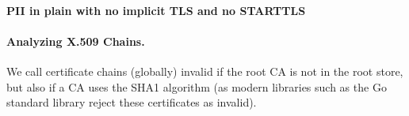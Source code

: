 \paragraph{PII in plain with no implicit TLS and no STARTTLS}
\fi


\paragraph{Analyzing X.509 Chains.}


We call certificate chains (globally) invalid if the root CA is not in the root store, but also if a CA uses the SHA1 algorithm (as modern libraries such as the Go standard library reject these certificates as invalid).



